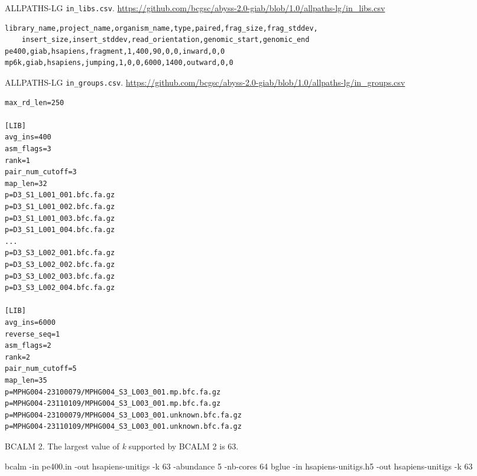 \documentclass[
  12pt,
  oneside,
  openany]{book}
\newenvironment{Shaded}{}{}
\newcommand{\ExtensionTok}[1]{#1}
\newcommand{\NormalTok}[1]{#1}
\begin{document}
\begin{appendices}
\begin{codelisting}
\end{codelisting}

\begin{codelisting}

\caption[ALLPATHS-LG \texttt{in\_libs.csv}.]{ALLPATHS-LG \texttt{in\_libs.csv}. \url{https://github.com/bcgsc/abyss-2.0-giab/blob/1.0/allpaths-lg/in_libs.csv}}

\hypertarget{lst:allpathslg2}{%
\label{lst:allpathslg2}}%
\begin{verbatim}
library_name,project_name,organism_name,type,paired,frag_size,frag_stddev,
    insert_size,insert_stddev,read_orientation,genomic_start,genomic_end
pe400,giab,hsapiens,fragment,1,400,90,0,0,inward,0,0
mp6k,giab,hsapiens,jumping,1,0,0,6000,1400,outward,0,0
\end{verbatim}

\end{codelisting}

\begin{codelisting}

\caption[ALLPATHS-LG \texttt{in\_groups.csv}.]{ALLPATHS-LG \texttt{in\_groups.csv}. \url{https://github.com/bcgsc/abyss-2.0-giab/blob/1.0/allpaths-lg/in_groups.csv}}

\hypertarget{lst:allpathslg3}{%
\label{lst:allpathslg3}}%
\begin{verbatim}
max_rd_len=250

[LIB]
avg_ins=400
asm_flags=3
rank=1
pair_num_cutoff=3
map_len=32
p=D3_S1_L001_001.bfc.fa.gz
p=D3_S1_L001_002.bfc.fa.gz
p=D3_S1_L001_003.bfc.fa.gz
p=D3_S1_L001_004.bfc.fa.gz
...
p=D3_S3_L002_001.bfc.fa.gz
p=D3_S3_L002_002.bfc.fa.gz
p=D3_S3_L002_003.bfc.fa.gz
p=D3_S3_L002_004.bfc.fa.gz

[LIB]
avg_ins=6000
reverse_seq=1
asm_flags=2
rank=2
pair_num_cutoff=5
map_len=35
p=MPHG004-23100079/MPHG004_S3_L003_001.mp.bfc.fa.gz
p=MPHG004-23110109/MPHG004_S3_L003_001.mp.bfc.fa.gz
p=MPHG004-23100079/MPHG004_S3_L003_001.unknown.bfc.fa.gz
p=MPHG004-23110109/MPHG004_S3_L003_001.unknown.bfc.fa.gz
\end{verbatim}

\end{codelisting}

\begin{codelisting}

\caption[BCALM 2.]{BCALM 2. The largest value of \emph{k} supported by BCALM 2 is 63.}

\hypertarget{lst:bcalm}{%
\label{lst:bcalm}}%
\begin{Shaded}
\begin{Highlighting}[]
\ExtensionTok{bcalm}\NormalTok{ -in pe400.in -out hsapiens-unitigs -k 63 -abundance 5 -nb-cores 64}
\ExtensionTok{bglue}\NormalTok{ -in hsapiens-unitigs.h5 -out hsapiens-unitigs -k 63}
\end{Highlighting}
\end{Shaded}


\end{codelisting}
\end{appendices}
\end{document}
